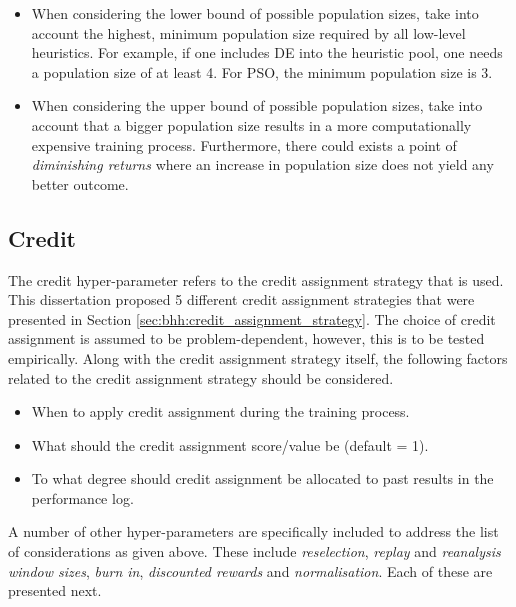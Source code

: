 \begin{itemize}
      \item When considering the lower bound of possible population sizes, take into account the highest, minimum population size required by all low-level heuristics. For example, if one includes \Acs{DE} into the heuristic pool, one needs a population size of at least 4. For \acs{PSO}, the minimum population size is 3.

      \item When considering the upper bound of possible population sizes, take into account that a bigger population size results in a more computationally expensive training process. Furthermore, there could exists a point of \textit{diminishing returns} where an increase in population size does not yield any better outcome.
\end{itemize}

\subsection{Credit}\label{sec:bhh:hyper_parameters:credit}

The credit hyper-parameter refers to the credit assignment strategy that is used. This dissertation proposed 5 different credit assignment strategies that were presented in Section \ref{sec:bhh:credit_assignment_strategy}. The choice of credit assignment is assumed to be problem-dependent, however, this is to be  tested empirically. Along with the credit assignment strategy itself, the following factors related to the credit assignment strategy should be considered.

\begin{itemize}
      \item When to apply credit assignment during the training process.
      \item What should the credit assignment score/value be (default = 1).
      \item To what degree should credit assignment be allocated to past results in the performance log.
\end{itemize}

A number of other hyper-parameters are specifically included to address the list of considerations as given above. These include \textit{reselection}, \textit{replay} and \textit{reanalysis window sizes}, \textit{burn in}, \textit{discounted rewards} and \textit{normalisation}. Each of these are presented next.

